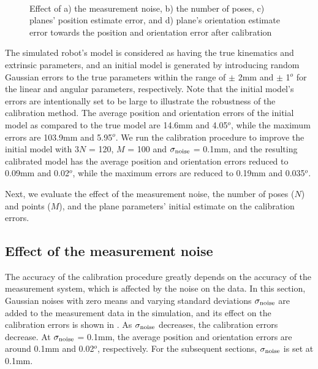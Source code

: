 \begin{figure*}[t]
  \centering
  \quad
  \\
  \centering
  \quad\quad
  \quad  
   \caption{Effect of a) the measurement noise, b) the number of poses, c) planes' position estimate error, and d) plane's orientation estimate error towards the position and orientation error after calibration}
\end{figure*}

The simulated robot's model is considered as having the true kinematics and extrinsic parameters, and an initial model is generated by introducing random Gaussian errors to the true parameters within the range of $\pm$ 2mm and $\pm$ 1$^o$ for the linear and angular parameters, respectively. Note that the initial model's errors are intentionally set to be large to illustrate the robustness of the calibration method. The average position and orientation errors of the initial model as compared to the true model are 14.6mm and 4.05$^o$, while the maximum errors are 103.9mm and 5.95$^o$. We run the calibration procedure to improve the initial model with $3N$ = 120, $M$ = 100 and $\sigma_{\rm{noise}}$ = 0.1mm, and the resulting calibrated model has the average position and orientation errors reduced to 0.09mm and 0.02$^o$, while the maximum errors are reduced to 0.19mm and 0.035$^o$.

Next, we evaluate the effect of the measurement noise, the number of poses ($N$) and points ($M$), and the plane parameters' initial estimate on the calibration errors. 


\subsection{Effect of the measurement noise}
\label{sec:meas_accuracy}
The accuracy of the calibration procedure greatly depends on the accuracy of the measurement system, which is affected by the noise on the data. In this section, Gaussian noises with zero means and varying standard deviations $\sigma_{\rm{noise}}$ are added to the measurement data in the simulation, and its effect on the calibration errors is shown in . As $\sigma_{\rm{noise}}$ decreases, the calibration errors decrease. At $\sigma_{\rm{noise}}$ = 0.1mm, the average position and orientation errors are around 0.1mm and 0.02$^o$, respectively. For the subsequent sections, $\sigma_{\rm{noise}}$ is set at 0.1mm. 

